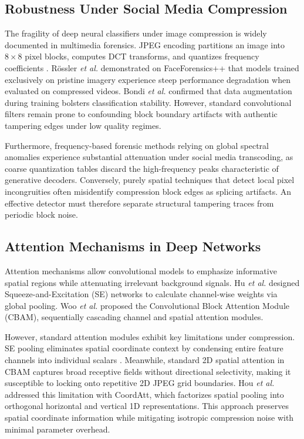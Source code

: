 \documentclass[conference]{IEEEtran}
\begin{document}
\subsection{Robustness Under Social Media Compression}
The fragility of deep neural classifiers under image compression is widely documented in multimedia forensics. JPEG encoding partitions an image into $8 \times 8$ pixel blocks, computes DCT transforms, and quantizes frequency coefficients \cite{verdoliva2020media}. R{\"o}ssler \emph{et al.} \cite{rossler2019faceforensics} demonstrated on FaceForensics++ that models trained exclusively on pristine imagery experience steep performance degradation when evaluated on compressed videos. Bondi \emph{et al.} \cite{bondi2020training} confirmed that data augmentation during training bolsters classification stability. However, standard convolutional filters remain prone to confounding block boundary artifacts with authentic tampering edges under low quality regimes.

Furthermore, frequency-based forensic methods relying on global spectral anomalies \cite{wang2020cnn} experience substantial attenuation under social media transcoding, as coarse quantization tables discard the high-frequency peaks characteristic of generative decoders. Conversely, purely spatial techniques that detect local pixel incongruities \cite{chai2020what} often misidentify compression block edges as splicing artifacts. An effective detector must therefore separate structural tampering traces from periodic block noise.

\subsection{Attention Mechanisms in Deep Networks}
Attention mechanisms allow convolutional models to emphasize informative spatial regions while attenuating irrelevant background signals. Hu \emph{et al.} \cite{hu2018squeeze} designed Squeeze-and-Excitation (SE) networks to calculate channel-wise weights via global pooling. Woo \emph{et al.} \cite{woo2018cbam} proposed the Convolutional Block Attention Module (CBAM), sequentially cascading channel and spatial attention modules.

However, standard attention modules exhibit key limitations under compression. SE pooling eliminates spatial coordinate context by condensing entire feature channels into individual scalars \cite{hou2021coordinate}. Meanwhile, standard 2D spatial attention in CBAM captures broad receptive fields without directional selectivity, making it susceptible to locking onto repetitive 2D JPEG grid boundaries. Hou \emph{et al.} \cite{hou2021coordinate} addressed this limitation with CoordAtt, which factorizes spatial pooling into orthogonal horizontal and vertical 1D representations. This approach preserves spatial coordinate information while mitigating isotropic compression noise with minimal parameter overhead.
\end{document}
